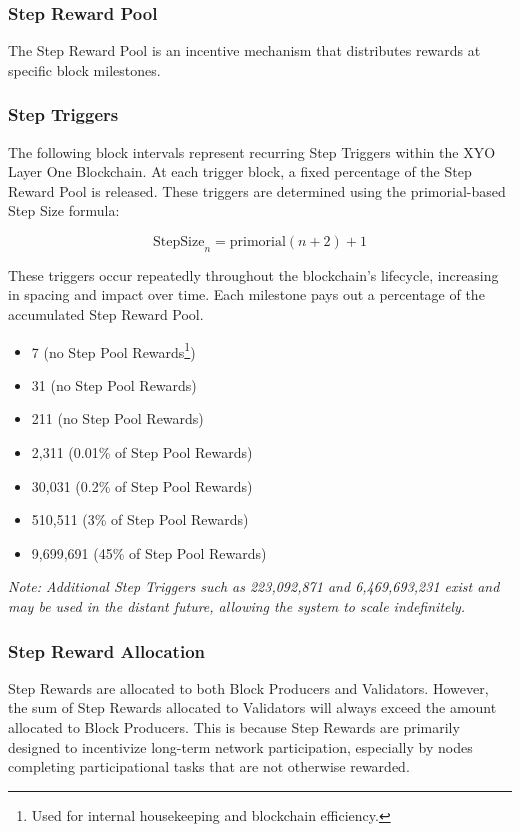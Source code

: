 \documentclass{article}
\begin{document}
\subsubsection{Step Reward Pool}
The Step Reward Pool is an incentive mechanism that distributes rewards at
specific block milestones.

\subsubsection{Step Triggers}

The following block intervals represent recurring Step Triggers within the XYO
Layer One Blockchain. At each trigger block, a fixed percentage of the Step
Reward Pool is released. These triggers are determined using the
primorial-based Step Size formula:

\[
    \text{StepSize}_n = \text{primorial}(n + 2) + 1
\]

These triggers occur repeatedly throughout the blockchain's lifecycle,
increasing in spacing and impact over time. Each milestone pays out a
percentage of the accumulated Step Reward Pool.

\begin{itemize}
    \item 7 (no Step Pool Rewards\footnote{Used for internal housekeeping and blockchain efficiency.})
    \item 31 (no Step Pool Rewards)
    \item 211 (no Step Pool Rewards)
    \item 2,311 (0.01\% of Step Pool Rewards)
    \item 30,031 (0.2\% of Step Pool Rewards)
    \item 510,511 (3\% of Step Pool Rewards)
    \item 9,699,691 (45\% of Step Pool Rewards)
\end{itemize}

\noindent
\textit{Note: Additional Step Triggers such as 223,092,871 and 6,469,693,231 exist and may be used in the distant future, allowing the system to scale indefinitely.}

\subsubsection{Step Reward Allocation}
Step Rewards are allocated to both Block Producers and Validators. However, the
sum of Step Rewards allocated to Validators will always exceed the amount
allocated to Block Producers. This is because Step Rewards are primarily
designed to incentivize long-term network participation, especially by nodes
completing participational tasks that are not otherwise rewarded.
\end{document}
